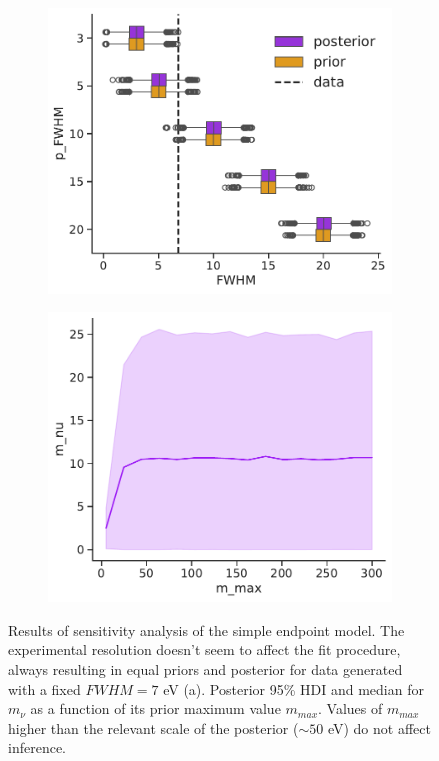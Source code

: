 \begin{figure}[t]
\begin{subfigure}[b]{0.5\linewidth}
    \includegraphics[width=\linewidth]{figures/ch3/endpoint/sensitivity_FW_0.pdf}
\caption{}
\end{subfigure}
    \begin{subfigure}[b]{0.5\linewidth}
\includegraphics[width=\linewidth]{figures/ch3/endpoint/sensitivity_0.pdf}
\caption{}
\end{subfigure}
\caption{Results of sensitivity analysis of the simple endpoint model. The experimental resolution doesn't seem to affect
the fit procedure, always resulting in equal priors and posterior for data generated with a fixed $FWHM=7$ eV (a).
Posterior 95\% HDI and median for $m_\nu$ as a function of its prior maximum value $m_{max}$. Values of $m_{max}$ higher
than the relevant scale of the posterior ($\sim 50$ eV) do not affect inference.} 
\label{fig:endsensitivity}
\end{figure}
